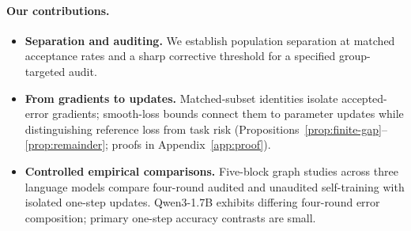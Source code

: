 \paragraph{Our contributions.}
\begin{itemize}
\item \textbf{Separation and auditing.} We establish population separation
at matched acceptance rates and a sharp corrective threshold for a
specified group-targeted audit.
\item \textbf{From gradients to updates.} Matched-subset identities isolate
accepted-error gradients; smooth-loss bounds connect them to parameter
updates while distinguishing reference loss from task risk
(Propositions~\ref{prop:finite-gap}--\ref{prop:remainder}; proofs in
Appendix~\ref{app:proof}).
\item \textbf{Controlled empirical comparisons.} Five-block graph studies
across three language models compare four-round audited and unaudited
self-training with isolated one-step updates. Qwen3-1.7B exhibits differing
four-round error composition; primary one-step accuracy contrasts are small.
\end{itemize}
